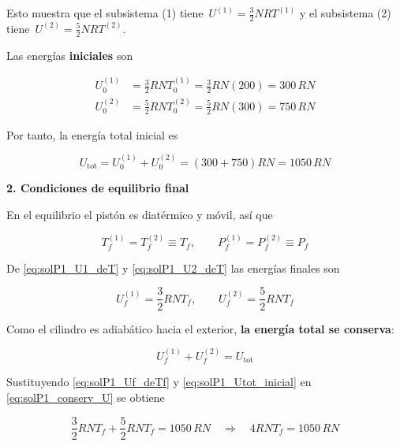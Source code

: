 \documentclass{article}
\begin{document}
Esto muestra que el subsistema \textcolor{Lochinvar}{(1)} tiene
\(\,U^{(1)} = \tfrac{3}{2}NR T^{(1)}\) y el subsistema
\textcolor{orange(colorwheel)}{(2)} tiene
\(\,U^{(2)} = \tfrac{5}{2}NR T^{(2)}\).

Las energías \textbf{iniciales} son

\begin{equation}
\begin{split}
U^{(1)}_{0}
&= \frac{3}{2}R N T^{(1)}_{0}
 = \frac{3}{2}R N (200)
 = 300\,R N
\\[4pt]
U^{(2)}_{0}
&= \frac{5}{2}R N T^{(2)}_{0}
 = \frac{5}{2}R N (300)
 = 750\,R N
\end{split}
\label{eq:solP1_U0s}
\end{equation}

Por tanto, la energía total inicial es

\begin{equation}
U_{\text{tot}}
= U^{(1)}_{0} + U^{(2)}_{0}
= (300 + 750)R N
= 1050\,R N
\label{eq:solP1_Utot_inicial}
\end{equation}

\vspace{0.4cm}
\noindent
\textcolor{Apple Green}{\textbf{2. Condiciones de equilibrio final}}

En el equilibrio el pistón es diatérmico y móvil, así que

\[
T^{(1)}_{f} = T^{(2)}_{f} \equiv T_{f},
\qquad
P^{(1)}_{f} = P^{(2)}_{f} \equiv P_{f}
\]

De \eqref{eq:solP1_U1_deT} y \eqref{eq:solP1_U2_deT} las energías finales son

\begin{equation}
U^{(1)}_{f} = \frac{3}{2}R N T_{f},
\qquad
U^{(2)}_{f} = \frac{5}{2}R N T_{f}
\label{eq:solP1_Uf_deTf}
\end{equation}

Como el cilindro es adiabático hacia el exterior,
\textcolor{Cinnabar}{\textbf{la energía total se conserva}}:

\begin{equation}
U^{(1)}_{f} + U^{(2)}_{f}
= U_{\text{tot}}
\label{eq:solP1_conserv_U}
\end{equation}

Sustituyendo \eqref{eq:solP1_Uf_deTf} y \eqref{eq:solP1_Utot_inicial} en
\eqref{eq:solP1_conserv_U} se obtiene

\begin{equation}
\frac{3}{2}R N T_{f}
+ \frac{5}{2}R N T_{f}
= 1050\,R N
\quad\Rightarrow\quad
4 R N T_{f} = 1050\,R N
\end{equation}
\end{document}
